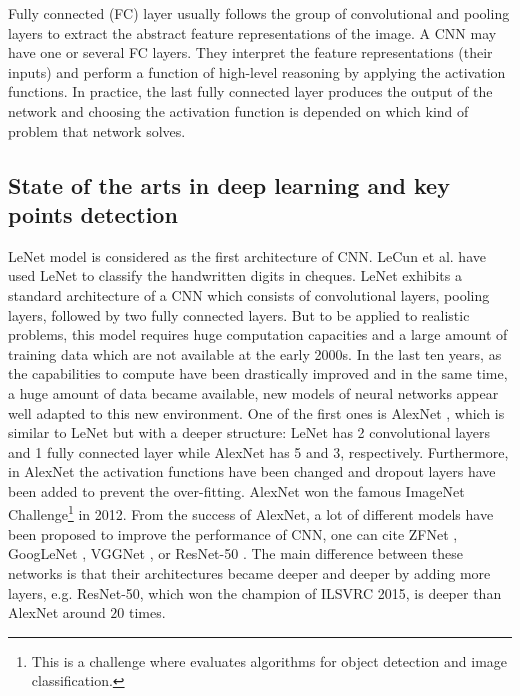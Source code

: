 \documentclass[review]{elsarticle}
\begin{document}
Fully connected (FC) layer usually follows the group of convolutional and pooling layers to extract the abstract feature representations of the image. A CNN may have one or several FC layers. They interpret the feature representations (their inputs) and perform a function of high-level reasoning by applying the activation functions. In practice, the last fully connected layer produces the output of the network and choosing the activation function is depended on which kind of problem that network solves.


\subsection{State of the arts in deep learning and key points detection}
LeNet \cite{lecun1998gradient} model is considered as the first architecture of CNN. LeCun et al. \cite{lecun1998gradient} have used LeNet to classify the handwritten digits in cheques. LeNet exhibits a standard architecture of a CNN which consists of convolutional layers, pooling layers, followed by two fully connected layers. But to be applied to realistic problems, this model requires huge computation capacities and a large amount of training data which are not available at the early 2000s. In the last ten years, as the capabilities to compute have been drastically improved and in the same time, a huge amount of data became available, new models of neural networks appear well adapted to this new environment. One of the first ones is AlexNet \cite{krizhevsky2012imagenet}, which is similar to LeNet \cite{lecun1998gradient} but with a deeper structure: LeNet has 2 convolutional layers and 1 fully connected layer while AlexNet has 5 and 3, respectively. Furthermore, in AlexNet the activation functions have been changed and dropout layers have been added to prevent the over-fitting. AlexNet won the famous ImageNet Challenge\footnote{This is a challenge where evaluates algorithms for object detection and image classification.} in 2012. From the success of AlexNet, a lot of different models have been proposed to improve the performance of CNN, one can cite ZFNet  \cite{zeiler2014visualizing}, GoogLeNet \cite{szegedy2015going}, VGGNet \cite{simonyan2014very}, or ResNet-50 \cite{he2016deep}. The main difference between these networks is that their architectures became deeper and deeper by adding more layers, e.g. ResNet-50, which won the champion of ILSVRC 2015, is deeper than AlexNet around $20$ times.
 
\end{document}
